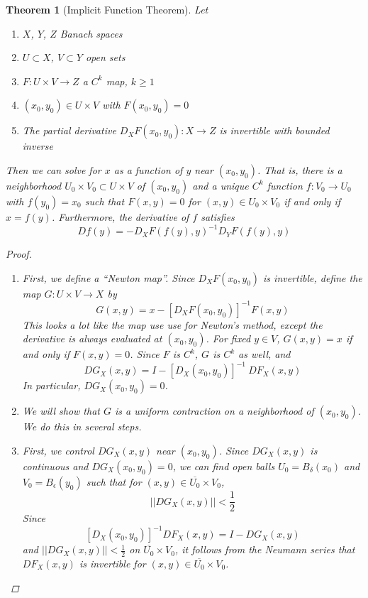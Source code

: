 \documentclass[12pt]{amsart}         %
\newtheorem{theorem}{Theorem}[section]
\theoremstyle{remark}
\begin{document}
\begin{theorem}[Implicit Function Theorem]
Let
\begin{enumerate}
\item $X$, $Y$, $Z$ Banach spaces
\item $U \subset X$, $V \subset Y$ open sets
\item $F: U \times V \rightarrow Z$ a $C^k$ map, $k \geq 1$
\item $(x_0, y_0) \in U \times V$ with $F(x_0, y_0) = 0$
\item The partial derivative $D_X F(x_0, y_0): X \rightarrow Z$ is invertible with bounded inverse
\end{enumerate}
Then we can solve for $x$ as a function of $y$ near $(x_0, y_0)$. That is, there is a neighborhood $U_0 \times V_0 \subset U \times V$ of $(x_0, y_0)$ and a unique $C^k$ function $f: V_0 \rightarrow U_0$ with $f(y_0) = x_0$ such that $F(x, y) = 0$ for $(x, y) \in U_0 \times V_0$ if and only if $x = f(y)$. Furthermore, the derivative of $f$ satisfies
\[
Df(y) = -D_X F(f(y),y)^{-1} D_Y F(f(y),y)
\]

\begin{proof}
\begin{enumerate}
\item First, we define a ``Newton map''. Since $D_X F(x_0, y_0)$ is invertible, define the map $G: U \times V \rightarrow X$ by 
\begin{equation}\label{defG}
G(x, y) = x - [D_X F(x_0, y_0)]^{-1} F(x, y)
\end{equation}
This looks a lot like the map use use for Newton's method, except the derivative is always evaluated at $(x_0, y_0)$. For fixed $y \in V$, $G(x, y) = x$ if and only if $F(x, y) = 0$. Since $F$ is $C^k$, $G$ is $C^k$ as well, and
\[
DG_X(x, y) = I - [D_X(x_0, y_0)]^{-1} \: DF_X(x, y)
\]
In particular, $DG_X(x_0, y_0) = 0$.

\item We will show that $G$ is a uniform contraction on a neighborhood of $(x_0, y_0)$. We do this in several steps.

\item First, we control $DG_X(x, y)$ near $(x_0, y_0)$. Since $DG_X(x, y)$ is continuous and $DG_X(x_0, y_0) = 0$, we can find open balls $U_0 = B_\delta(x_0)$ and $V_0 = B_\epsilon(y_0)$ such that for $(x, y) \in \overline{U_0} \times V_0$,
\[
||DG_X(x, y)|| < \frac{1}{2} 
\]
Since 
\[
[D_X(x_0, y_0)]^{-1} DF_X(x, y) = I - DG_X(x, y)
\]
and $||DG_X(x, y)|| < \frac{1}{2}$ on $\overline{U_0} \times V_0$, it follows from the Neumann series that $DF_X(x, y)$ is invertible for $(x, y) \in \overline{U_0} \times V_0$.


\end{enumerate}
\end{proof}
\end{theorem}
\end{document}
